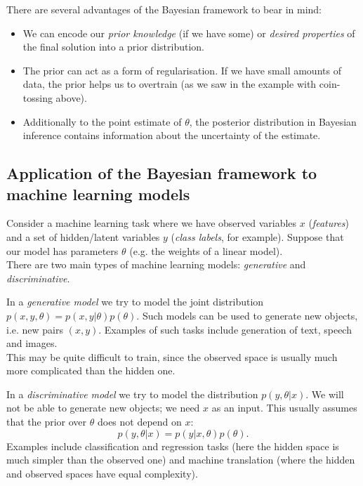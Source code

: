 There are several advantages of the Bayesian framework to bear in mind:
\begin{itemize}
\item We can encode our \textit{prior knowledge} (if we have some) or \textit{desired properties} of the final solution into a prior distribution.
\item The prior can act as a form of regularisation. If we have small amounts of data, the prior helps us to overtrain (as we saw in the example with coin-tossing above).
\item Additionally to the point estimate of $\theta$, the posterior distribution in Bayesian inference contains information about the uncertainty of the estimate. 
\end{itemize}



\newpage
\subsection{Application of the Bayesian framework to machine learning models}
Consider a machine learning task where we have observed variables $x$ (\textit{features}) and a set of hidden/latent variables $y$ (\textit{class labels}, for example). Suppose that our model has parameters $\theta$ (e.g. the weights of a linear model).\\

There are two main types of machine learning models: \textit{generative} and \textit{discriminative}.

\begin{framedef}
In a \textit{generative model} we try to model the joint distribution $p(x,y,\theta) = p(x,y| \theta)p(\theta)$. Such models can be used to generate new objects, i.e. new pairs $(x,y)$. Examples of such tasks include generation of text, speech and images.\\

This may be quite difficult to train, since the observed space is usually much more complicated than the hidden one.
\end{framedef}

\begin{framedef}
In a \textit{discriminative model} we try to model the distribution $p(y, \theta | x)$. We will not be able to generate new objects; we need $x$ as an input. This usually assumes that the prior over $\theta$ does not depend on $x$:
\begin{equation*}
p(y,\theta | x) = p(y | x,\theta) p(\theta).
\end{equation*}
Examples include classification and regression tasks (here the hidden space is much simpler than the observed one) and machine translation (where the hidden and observed spaces have equal complexity).
\end{framedef}

